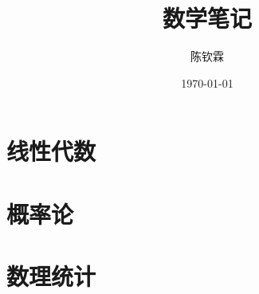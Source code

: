 \documentclass[oneside,hyperref,a4paper,UTF8]{ctexbook}
\theoremstyle{definition} \newtheorem{definition}{定义}[chapter]
\theoremstyle{definition} \newtheorem{theorem}[definition]{定理}
\theoremstyle{definition} \newtheorem{lemma}[definition]{引理}
\theoremstyle{definition} \newtheorem{corollary}[definition]{推论}
\theoremstyle{remark} \newtheorem*{remark}{Remark}
\begin{document}
\author{陈钦霖}
\title{数学笔记}
\date{\today}

\maketitle
\tableofcontents

% 
% 

\part{线性代数}







\part{概率论}






\part{数理统计}




\end{document}
